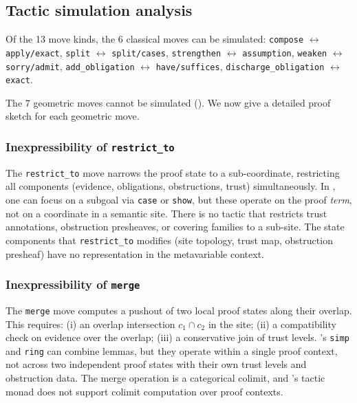 \documentclass[11pt]{article}
\begin{document}
\subsection{Tactic simulation analysis}

Of the 13 move kinds, the 6 classical moves can be simulated:
\texttt{compose} $\leftrightarrow$ \texttt{apply/exact},
\texttt{split} $\leftrightarrow$ \texttt{split/cases},
\texttt{strengthen} $\leftrightarrow$ \texttt{assumption},
\texttt{weaken} $\leftrightarrow$ \texttt{sorry/admit},
\texttt{add\_obligation} $\leftrightarrow$ \texttt{have/suffices},
\texttt{discharge\_obligation} $\leftrightarrow$ \texttt{exact}.

The 7 geometric moves cannot be simulated
().  We now give a detailed proof
sketch for each geometric move.

\subsubsection{Inexpressibility of \texttt{restrict\_to}}

The \texttt{restrict\_to} move narrows the proof state to a
sub-coordinate, restricting all components (evidence, obligations,
obstructions, trust) simultaneously.  In \LEAN, one can focus on
a subgoal via \texttt{case} or \texttt{show}, but these operate
on the proof \emph{term}, not on a coordinate in a semantic site.
There is no \LEAN{} tactic that restricts trust annotations,
obstruction presheaves, or covering families to a sub-site.
The state components that \texttt{restrict\_to} modifies
(site topology, trust map, obstruction presheaf) have no
representation in the \LEAN{} metavariable context.

\subsubsection{Inexpressibility of \texttt{merge}}

The \texttt{merge} move computes a pushout of two local proof
states along their overlap.  This requires:
(i) an overlap intersection $c_1 \cap c_2$ in the site;
(ii) a compatibility check on evidence over the overlap;
(iii) a conservative join of trust levels.
\LEAN's \texttt{simp} and \texttt{ring} can combine lemmas,
but they operate within a single proof context, not across
two independent proof states with their own trust levels
and obstruction data.  The merge operation is a categorical
colimit, and \LEAN's tactic monad does not support colimit
computation over proof contexts.
\end{document}
